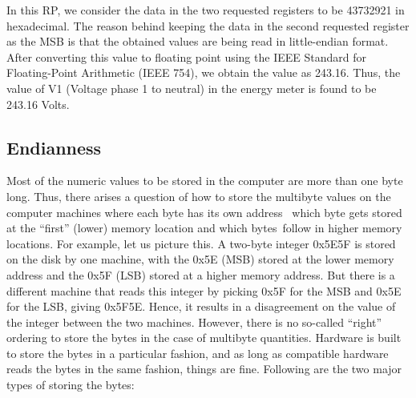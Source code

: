 In this RP, we consider the data in the two requested registers to be 43732921
in hexadecimal. The reason behind keeping the data in the second requested register
as the MSB is that the obtained values are being read in little-endian format.
After converting this value to floating point using the
IEEE Standard for Floating-Point Arithmetic (IEEE 754), we obtain the
value as 243.16. Thus, the value of V1 (Voltage phase 1 to neutral) in the
energy meter is found to be 243.16 Volts.

\subsection{Endianness}
Most of the numeric values to be stored in the computer are more than
one byte long. Thus, there arises a question of how to store the
multibyte values on the computer machines where each byte has its own
address \ie\ which byte gets stored at the ``first'' (lower) memory
location and which bytes follow in higher memory locations. For
example, let us picture this. A two-byte integer 0x5E5F is stored on the disk by one machine, with the 0x5E (MSB) stored at the lower memory address and the 0x5F (LSB) stored at a higher memory address.
But there is a different machine that reads this integer by picking 0x5F for the MSB and 0x5E for the LSB, giving 0x5F5E.
Hence, it results in a disagreement on the value of the integer between the two machines. However, there is no so-called ``right''
ordering to store the bytes in the case of multibyte quantities.
Hardware is built to store the bytes in a particular fashion, and as long as compatible hardware reads the bytes in the same fashion, things are
fine. Following are the two major types of storing the bytes:

